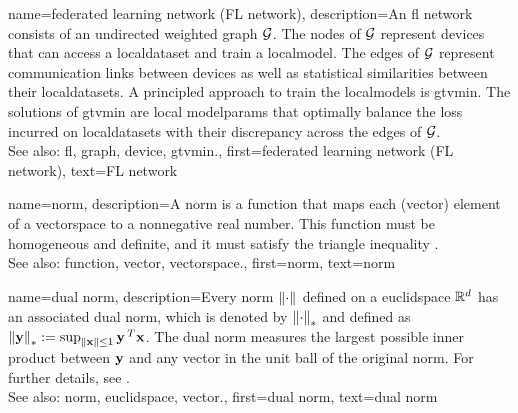 {name={federated learning network (FL network)},
	description={An \gls{fl} network consists of 
		an undirected weighted \gls{graph} $\mathcal{G}$. The nodes of $\mathcal{G}$ represent \glspl{device} 
		that can access a \gls{localdataset} and train a \gls{localmodel}. The edges of $\mathcal{G}$ represent 
		communication links between \glspl{device} as well as statistical similarities between their \glspl{localdataset}. 
		A principled approach to train the \glspl{localmodel} is \gls{gtvmin}. The solutions of \gls{gtvmin} are local 
		\gls{modelparams} that optimally balance the \gls{loss} incurred on \glspl{localdataset} with their \gls{discrepancy} 
		across the edges of $\mathcal{G}$.
	    			\\ 
		See also: \gls{fl}, \gls{graph}, \gls{device}, \gls{gtvmin}.},
	first={federated learning network (FL network)},
	text={FL network} 
}

{name={norm},
	description={A norm is a \gls{function} that maps each (\gls{vector}) element 
		of a \gls{vectorspace} to a nonnegative real number. This \gls{function} must be 
		homogeneous and definite, and it must satisfy the triangle inequality \cite{HornMatAnalysis}.
		\\
		See also: \gls{function}, \gls{vector}, \gls{vectorspace}.},
	first={norm},
	text={norm} 
}

{name={dual norm},
	description={Every \gls{norm} $\left\Vert {\cdot} \right\Vert_{}$ defined on a \gls{euclidspace} $\mathbb{R}^{d}$ 
		has an associated dual \gls{norm}, which is denoted by $\left\Vert {\cdot} \right\Vert_{*}$ and defined as 
		$\left\Vert {{\bf y}} \right\Vert_{*} := \sup_{\Vert {{\bf x}} \Vert{} \le 1} {\bf y}\,^{T} {\bf x}$. 
		The dual \gls{norm} measures the largest possible inner product between ${\bf y}$ 
		and any \gls{vector} in the unit ball of the original \gls{norm}. For further details, see 
		\cite[Sec.~A.1.6]{BoydConvexBook}.
					\\ 
		See also: \gls{norm}, \gls{euclidspace}, \gls{vector}.},
	first={dual norm},
	text={dual norm}
}

